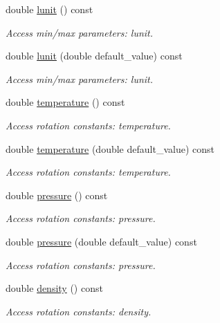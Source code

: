 \begin{DoxyCompactItemize}
double \hyperlink{struct_d_d4hep_1_1_x_m_l_1_1_dimension_a0d0bd5961871858cd652f4f2b8cae305}{lunit} () const
\begin{DoxyCompactList}\small\item\em Access min/max parameters\+: lunit. \end{DoxyCompactList}\item 
double \hyperlink{struct_d_d4hep_1_1_x_m_l_1_1_dimension_ac2040c00dca00f75d40882c42a7884ee}{lunit} (double default\+\_\+value) const
\begin{DoxyCompactList}\small\item\em Access min/max parameters\+: lunit. \end{DoxyCompactList}\item 
double \hyperlink{struct_d_d4hep_1_1_x_m_l_1_1_dimension_aed42e5f342465fae8aa5ff5b968b1aa7}{temperature} () const
\begin{DoxyCompactList}\small\item\em Access rotation constants\+: temperature. \end{DoxyCompactList}\item 
double \hyperlink{struct_d_d4hep_1_1_x_m_l_1_1_dimension_a2a92c1e31e74a84db538f43561ab6f64}{temperature} (double default\+\_\+value) const
\begin{DoxyCompactList}\small\item\em Access rotation constants\+: temperature. \end{DoxyCompactList}\item 
double \hyperlink{struct_d_d4hep_1_1_x_m_l_1_1_dimension_aced260cb163faa0dca3a0d96eec58b40}{pressure} () const
\begin{DoxyCompactList}\small\item\em Access rotation constants\+: pressure. \end{DoxyCompactList}\item 
double \hyperlink{struct_d_d4hep_1_1_x_m_l_1_1_dimension_abea5761065256250c910a682adbf08f6}{pressure} (double default\+\_\+value) const
\begin{DoxyCompactList}\small\item\em Access rotation constants\+: pressure. \end{DoxyCompactList}\item 
double \hyperlink{struct_d_d4hep_1_1_x_m_l_1_1_dimension_a7d1bda3390c6e29327b06507fed0e5fd}{density} () const
\begin{DoxyCompactList}\small\item\em Access rotation constants\+: density. \end{DoxyCompactList}\item 

\end{DoxyCompactItemize}
